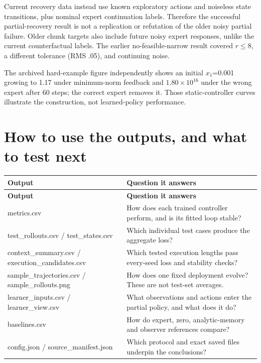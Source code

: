 \documentclass{l4dc2026}
\begin{document}
{\small Current recovery data instead use known exploratory actions and noiseless state transitions, plus nominal expert continuation labels. Therefore the successful partial-recovery result is not a replication or refutation of the older noisy partial failure. Older chunk targets also include future noisy expert responses, unlike the current counterfactual labels. The earlier no-feasible-narrow result covered $r\leq8$, a different tolerance (RMS .05), and continuing noise.\par}

{\small The archived hard-example figure independently shows an initial $x_1$=0.001 growing to 1.17 under minimum-norm feedback and $1.80\times10^{16}$ under the wrong expert after 60 steps; the correct expert removes it. Those static-controller curves illustrate the construction, not learned-policy performance.\par}

\section{How to use the outputs, and what to test next}
{\small\setlength{\tabcolsep}{3pt}
\begin{longtable}{@{}p{}p{}@{}}
\toprule
\textbf{Output} & \textbf{Question it answers} \\
\midrule\endfirsthead
\toprule
\textbf{Output} & \textbf{Question it answers} \\
\midrule\endhead
\bottomrule\endfoot
metrics.csv & How does each trained controller perform, and is its fitted loop stable? \\
test\_rollouts.csv / test\_states.csv & Which individual test cases produce the aggregate loss? \\
context\_summary.csv / execution\_candidates.csv & Which tested execution lengths pass every-seed loss and stability checks? \\
sample\_trajectories.csv / sample\_rollouts.png & How does one fixed deployment evolve? These are not test-set averages. \\
learner\_inputs.csv / learner\_view.csv & What observations and actions enter the partial policy, and what does it do? \\
baselines.csv & How do expert, zero, analytic-memory and observer references compare? \\
config.json / source\_manifest.json & Which protocol and exact saved files underpin the conclusions? \\
\end{longtable}}
\end{document}
